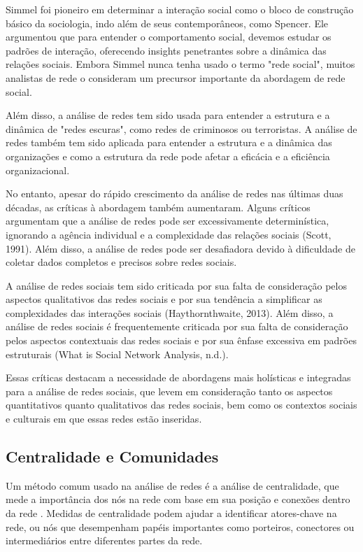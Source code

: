Simmel foi pioneiro em determinar a interação social como o bloco de construção básico da sociologia, indo além de seus contemporâneos, como Spencer. Ele argumentou que para entender o comportamento social, devemos estudar os padrões de interação, oferecendo insights penetrantes sobre a dinâmica das relações sociais. Embora Simmel nunca tenha usado o termo "rede social", muitos analistas de rede o consideram um precursor importante da abordagem de rede social.

Além disso, a análise de redes tem sido usada para entender a estrutura e a dinâmica de "redes escuras", como redes de criminosos ou terroristas. A análise de redes também tem sido aplicada para entender a estrutura e a dinâmica das organizações e como a estrutura da rede pode afetar a eficácia e a eficiência organizacional.

No entanto, apesar do rápido crescimento da análise de redes nas últimas duas décadas, as críticas à abordagem também aumentaram. Alguns críticos argumentam que a análise de redes pode ser excessivamente determinística, ignorando a agência individual e a complexidade das relações sociais (Scott, 1991). Além disso, a análise de redes pode ser desafiadora devido à dificuldade de coletar dados completos e precisos sobre redes sociais.

A análise de redes sociais tem sido criticada por sua falta de consideração pelos aspectos qualitativos das redes sociais e por sua tendência a simplificar as complexidades das interações sociais (Haythornthwaite, 2013). Além disso, a análise de redes sociais é frequentemente criticada por sua falta de consideração pelos aspectos contextuais das redes sociais e por sua ênfase excessiva em padrões estruturais (What is Social Network Analysis, n.d.).

Essas críticas destacam a necessidade de abordagens mais holísticas e integradas para a análise de redes sociais, que levem em consideração tanto os aspectos quantitativos quanto qualitativos das redes sociais, bem como os contextos sociais e culturais em que essas redes estão inseridas.

\subsection*{Centralidade e Comunidades}

Um método comum usado na análise de redes é a análise de centralidade, que mede a importância dos nós na rede com base em sua posição e conexões dentro da rede \cite[]{1978_Freeman}. Medidas de centralidade podem ajudar a identificar atores-chave na rede, ou nós que desempenham papéis importantes como porteiros, conectores ou intermediários entre diferentes partes da rede.

